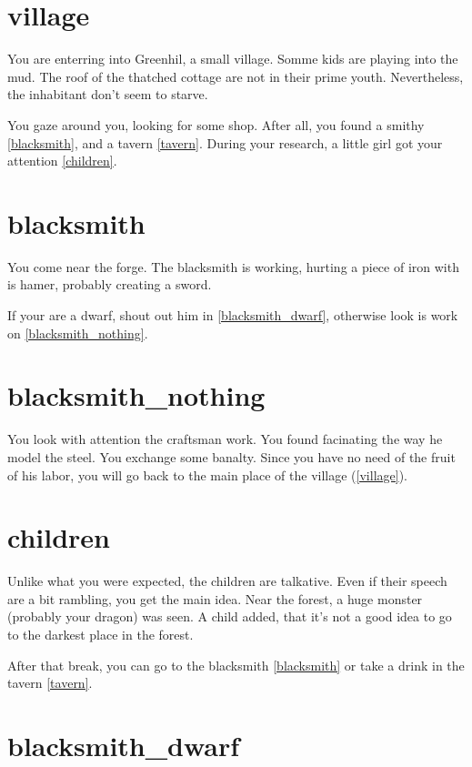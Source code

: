 
\section{village}

You are enterring into Greenhil, a small village. Somme kids are playing into
the mud. The roof of the thatched cottage are not in their prime youth.
Nevertheless, the inhabitant don't seem to starve.

You gaze around you, looking for some shop. After all, you found a smithy
\ref{blacksmith}, and a tavern \ref{tavern}. During your research, a little girl
got your attention \ref{children}.

\section{blacksmith}

You come near the forge. The blacksmith is working, hurting a piece of iron with
is hamer, probably creating a sword.

If your are a dwarf, shout out him in \ref{blacksmith_dwarf}, otherwise look is
work on \ref{blacksmith_nothing}.

\section{blacksmith_nothing}

You look with attention the craftsman work. You found facinating the way he
model the steel. You exchange some banalty. Since you have no need of the fruit
of his labor, you will go back to the main place of the village (\ref{village}).

\section{children}

Unlike what you were expected, the children are talkative. Even if their speech
are a bit rambling, you get the main idea. Near the forest, a huge monster
(probably your dragon) was seen. A child added, that it's not a good idea to go
to the darkest place in the forest.

After that break, you can go to the blacksmith \ref{blacksmith} or take a drink in
the tavern \ref{tavern}.

\section{blacksmith_dwarf}

